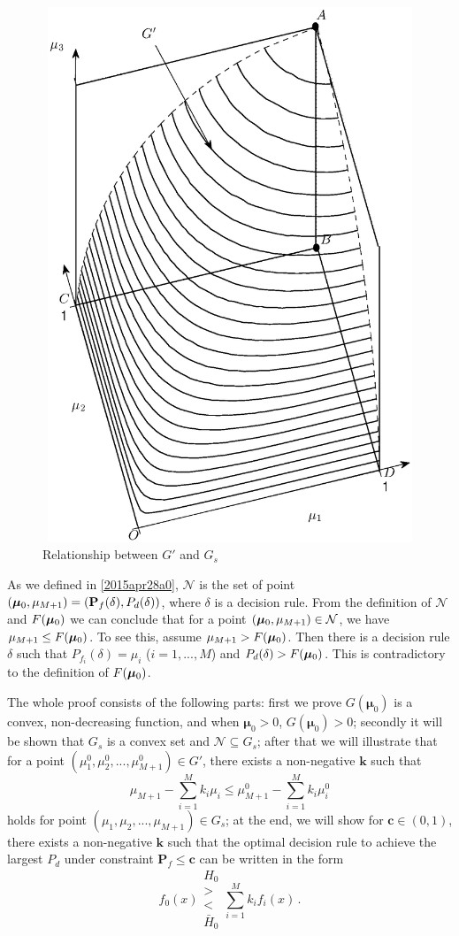 \begin{figure}[!t]
\centering
\includegraphics[width = 12cm, height=16cm]{2/example_pic.eps}
\caption{Relationship between $G'$ and $G_s$}
\label{fig: feb18}
\end{figure}
As we defined in \eqref{2015apr28a0}, $\mathcal{N}$ is the set of point $(\boldsymbol{\mu}_0, \mu_{M+1})=(\mathbf{P}_f(\delta), P_d(\delta))$, where $\delta$ is a decision rule.
From the definition of $\mathcal{N}$ and $F(\boldsymbol{\mu}_0)$ we can conclude that for a point $(\boldsymbol{\mu}_0, \mu_{M+1}) \in \mathcal{N}$, we have $\mu_{M+1} \leq F(\boldsymbol{\mu}_0)$. 
To see this, assume $\mu_{M+1} > F(\boldsymbol{\mu}_0)$. Then there is a decision rule $\delta$ such that $P_{f_i}(\delta) = \mu_i$ ($i=1, ..., M$) and $P_d(\delta) > F(\boldsymbol{\mu}_0)$. This is contradictory to the definition of $F(\boldsymbol{\mu}_0)$. 

The whole proof consists of the following parts: first we prove $G(\boldsymbol{\mu}_0)$ is a convex, non-decreasing function, and when $\boldsymbol{\mu}_0 > 0$, $G(\boldsymbol{\mu}_0) > 0$;
secondly it will be shown that $G_s$ is a convex set and $\mathcal{N} \subseteq G_s$; 
after that we will illustrate that for a point $(\mu_1^0, \mu_2^0, ..., \mu_{M+1}^0) \in G'$, there exists a non-negative $\mathbf{k}$ such that 
\[
\mu_{M+1} - \sum_{i=1}^{M}k_i\mu_i \leq \mu_{M+1}^0 - \sum_{i=1}^{M}k_i\mu_i^0
\]
holds for point $(\mu_1, \mu_2, ..., \mu_{M+1}) \in G_s$;
at the end, we will show for $\mathbf{c} \in (0, 1)$, there exists a non-negative $\mathbf{k}$ such that the optimal decision rule to achieve the largest $P_d$ under constraint $\mathbf{P}_f \leq \mathbf{c}$ can be written in the form
\[
f_0(x) \substack{H_0 \\ > \\ < \\ \bar{H}_0} \sum_{i=1}^{M}k_if_i(x)\,.
\]

